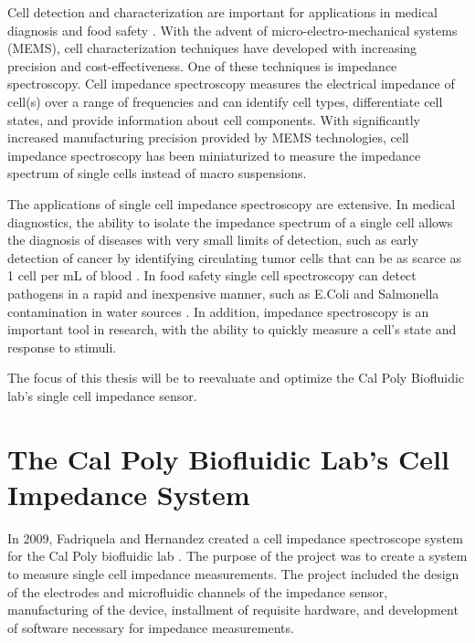 \label{ch: introduction}

\par Cell detection and characterization are important for applications in medical diagnosis and food safety \cite{mansor_electrical_2017}. With the advent of micro-electro-mechanical systems (MEMS), cell characterization techniques have developed with increasing precision and cost-effectiveness. One of these techniques is impedance spectroscopy. Cell impedance spectroscopy measures the electrical impedance of cell(s) over a range of frequencies and can identify cell types, differentiate cell states, and provide information about cell components. With significantly increased manufacturing precision provided by MEMS technologies, cell impedance spectroscopy has been miniaturized to measure the impedance spectrum of single cells instead of macro suspensions. 

\par The applications of single cell impedance spectroscopy are extensive. In medical diagnostics, the ability to isolate the impedance spectrum of a single cell allows the diagnosis of diseases with very small limits of detection, such as early detection of cancer by identifying circulating tumor cells that can be as scarce as 1 cell per mL of blood \cite{kantara_methods_2015}. In food safety single cell spectroscopy can detect pathogens in a rapid and inexpensive manner, such as E.Coli and Salmonella contamination in water sources \cite{pandey_contamination_2014}. In addition, impedance spectroscopy is an important tool in research, with the ability to quickly measure a cell's state and response to stimuli. 

\par The focus of this thesis will be to reevaluate and optimize the Cal Poly Biofluidic lab's single cell impedance sensor.

\section[Cal Poly's IS System]{The Cal Poly Biofluidic Lab's Cell Impedance System}

\par In 2009, Fadriquela and Hernandez created a cell impedance spectroscope system for the Cal Poly biofluidic lab \cite{fadriquela_design_2009-1,hernandez_single_2009-1}. The purpose of the project was to create a system to measure single cell impedance measurements. The project included the design of the electrodes and microfluidic channels of the impedance sensor, manufacturing of the device, installment of requisite hardware, and development of software necessary for impedance measurements. 

